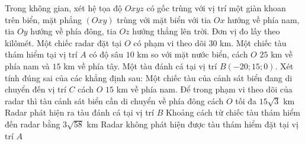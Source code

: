 \begin{ex}%
    Trong không gian, xét hệ tọa độ $Oxyz$ có gốc trùng với vị trí một giàn khoan trên biển, mặt phẳng $(Oxy)$ trùng với mặt biển với tia $Ox$ hướng về phía nam, tia $Oy$ hướng về phía đông, tia $Oz$ hướng thẳng lên trời. Đơn vị đo lấy theo kilômét. Một chiếc radar đặt tại $O$ có phạm vi theo dõi $30$ km. Một chiếc tàu thám hiểm tại vị trí $A$ có độ sâu $10$ km so với mặt nước biển, cách $O$ $25$ km về phía nam và $15$ km về phía tây. Một tàu đánh cá tại vị trí $B(-20;15;0)$. Xét tính đúng sai của các khẳng định sau:
    \choiceTF
    {\True Một chiếc tàu của cảnh sát biển đang di chuyển đến vị trí $C$ cách $O$ $15$ km về phía nam. Để trong phạm vi theo dõi của radar thì tàu cảnh sát biển cần di chuyển về phía đông cách $O$ tối đa $15\sqrt{3}$ km}
    {\True Radar phát hiện ra tàu đánh cá tại vị trí $B$}
    {Khoảng cách từ chiếc tàu thám hiểm đến radar bằng $3\sqrt{58}$ km}
    {\True Radar không phát hiện được tàu thám hiểm đặt tại vị trí $A$}
\end{ex}

